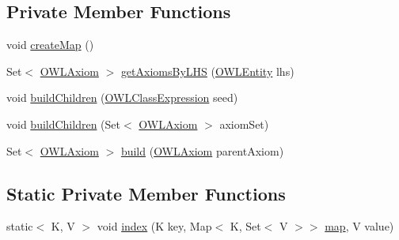 \subsection*{Private Member Functions}
\begin{DoxyCompactItemize}
\item 
void \hyperlink{classorg_1_1semanticweb_1_1owlapi_1_1debugging_1_1_justification_map_af6fd90c6eda5217e2ed6ac0b6b82ee7d}{create\-Map} ()
\item 
Set$<$ \hyperlink{interfaceorg_1_1semanticweb_1_1owlapi_1_1model_1_1_o_w_l_axiom}{O\-W\-L\-Axiom} $>$ \hyperlink{classorg_1_1semanticweb_1_1owlapi_1_1debugging_1_1_justification_map_a2a246840e02fb60141a283cdbc9a4b8e}{get\-Axioms\-By\-L\-H\-S} (\hyperlink{interfaceorg_1_1semanticweb_1_1owlapi_1_1model_1_1_o_w_l_entity}{O\-W\-L\-Entity} lhs)
\item 
void \hyperlink{classorg_1_1semanticweb_1_1owlapi_1_1debugging_1_1_justification_map_a065cede15d5b64e21f72fd4cefc50bbb}{build\-Children} (\hyperlink{interfaceorg_1_1semanticweb_1_1owlapi_1_1model_1_1_o_w_l_class_expression}{O\-W\-L\-Class\-Expression} seed)
\item 
void \hyperlink{classorg_1_1semanticweb_1_1owlapi_1_1debugging_1_1_justification_map_ab169cf2c75fc625d8175b1d084891ec7}{build\-Children} (Set$<$ \hyperlink{interfaceorg_1_1semanticweb_1_1owlapi_1_1model_1_1_o_w_l_axiom}{O\-W\-L\-Axiom} $>$ axiom\-Set)
\item 
Set$<$ \hyperlink{interfaceorg_1_1semanticweb_1_1owlapi_1_1model_1_1_o_w_l_axiom}{O\-W\-L\-Axiom} $>$ \hyperlink{classorg_1_1semanticweb_1_1owlapi_1_1debugging_1_1_justification_map_a2384fc275ca9f8e8f7c7214303370e5a}{build} (\hyperlink{interfaceorg_1_1semanticweb_1_1owlapi_1_1model_1_1_o_w_l_axiom}{O\-W\-L\-Axiom} parent\-Axiom)
\end{DoxyCompactItemize}
\subsection*{Static Private Member Functions}
\begin{DoxyCompactItemize}
\item 
static$<$ K, V $>$ void \hyperlink{classorg_1_1semanticweb_1_1owlapi_1_1debugging_1_1_justification_map_a1b2a03dfe50561c4957ca036151e86bf}{index} (K key, Map$<$ K, Set$<$ V $>$$>$ \hyperlink{classorg_1_1semanticweb_1_1owlapi_1_1debugging_1_1_justification_map_aab3783442953574d75827bae809f5a1a}{map}, V value)
\end{DoxyCompactItemize}
